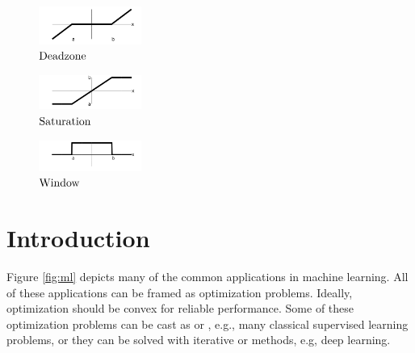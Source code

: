 \documentclass{article}
\begin{document}
    \begin{figure}[b!]
        \centering
        \includegraphics[width=0.3\textwidth]{./figs/deadzone_linear.png}
        \caption{$\text{Deadzone}$}
        \label{fig:deadzone_linear}
    \end{figure}
    \begin{figure}[b!]
        \centering
        \includegraphics[width=0.3\textwidth]{./figs/sat.png}
        \caption{$\text{Saturation}$}
        \label{fig:sat}
    \end{figure}
    \begin{figure}[b!]
        \centering
        \includegraphics[width=0.3\textwidth]{./figs/win.png}
        \caption{$\text{Window}$}
        \label{fig:deadzone_linear}
    \end{figure}

    \clearpage

\section{Introduction}

Figure \ref{fig:ml} depicts many of the common applications in machine learning.
All of these applications can be framed as optimization problems.
Ideally, optimization should be convex for reliable performance.
Some of these optimization problems can be cast as \LP or \QP, e.g., many classical supervised learning problems,
or they can be solved with iterative \LP or \QP methods, e.g, deep learning.
\end{document}
